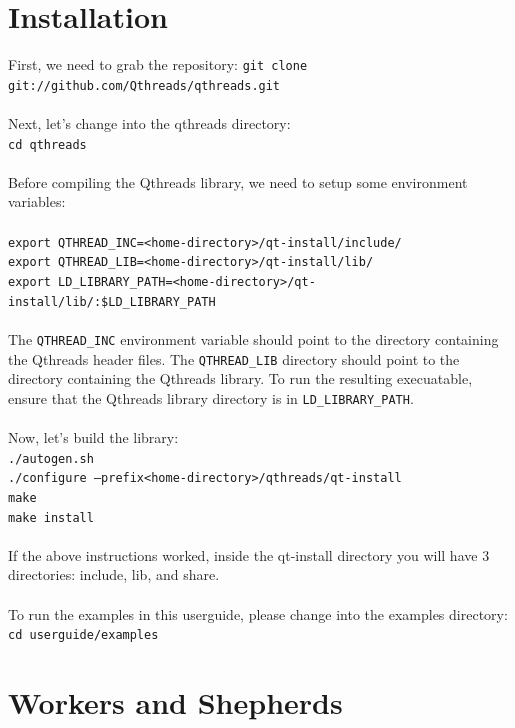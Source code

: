\documentclass[12pt,fullpage]{article}
\begin{document}
\section{Installation}
First, we need to grab the repository:
{\footnotesize{\tt git clone git://github.com/Qthreads/qthreads.git}}
\\ \\
Next, let's change into the qthreads directory:
\\
{\footnotesize{\tt cd qthreads}}
\\ \\
Before compiling the Qthreads library, we need to setup some environment variables:
\\ \\
{\footnotesize{\tt export QTHREAD\_INC=<home-directory>/qt-install/include/}}
\\
{\footnotesize{\tt export QTHREAD\_LIB=<home-directory>/qt-install/lib/}}
\\
{\footnotesize{\tt export LD\_LIBRARY\_PATH=<home-directory>/qt-install/lib/:\$LD\_LIBRARY\_PATH}}
\\ \\
The {\tt QTHREAD\_INC} environment variable should point to the directory containing the Qthreads header files.  The {\tt QTHREAD\_LIB} directory should point to the directory containing the Qthreads library.  To run the resulting execuatable, ensure that the Qthreads library directory is in {\tt LD\_LIBRARY\_PATH}.
\\ \\
Now, let's build the library: 
\\
{\footnotesize{\tt ./autogen.sh}}
\\
{\footnotesize{\tt ./configure --prefix<home-directory>/qthreads/qt-install}}
\\
{\footnotesize{\tt make}}
\\
{\footnotesize{\tt make install}}
\\ \\
If the above instructions worked, inside the qt-install directory you will have 3 directories: include, lib, and share.
\\ \\ 
To run the examples in this userguide, please change into the examples directory:
\\
{\footnotesize{\tt cd userguide/examples}}

\newpage
\section{Workers and Shepherds}
\end{document}
